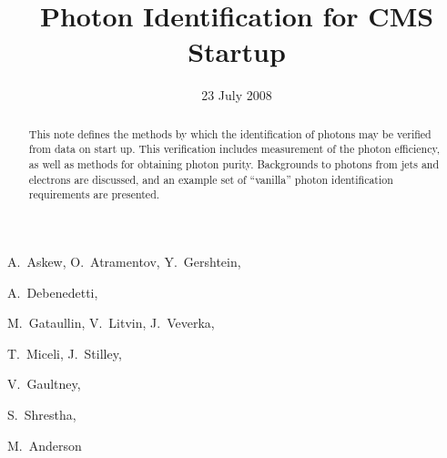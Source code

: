 \documentclass{cmspaper}
\begin{document}

\begin{titlepage}

   \date{23 July 2008}

  \title{Photon Identification for CMS Startup}

  \begin{Authlist}
    A.~Askew, O.~Atramentov, Y.~Gershtein,

    A.~Debenedetti,

    M.~Gataullin, V.~Litvin, J.~Veverka, 

    T.~Miceli, J.~Stilley,

    V.~Gaultney,

    S.~Shrestha,

    M.~Anderson

  \end{Authlist}


  \begin{abstract}
This note defines the methods by which the identification of photons may be verified from data
on start up.  This verification includes measurement of the photon efficiency, as well as methods
for obtaining photon purity.  Backgrounds to photons from jets and electrons are discussed, and an
example set of ``vanilla'' photon identification requirements are presented. 
  \end{abstract} 

  
\end{titlepage}
\tableofcontents
\listoffigures
\listoftables
\pagebreak
\end{document}
